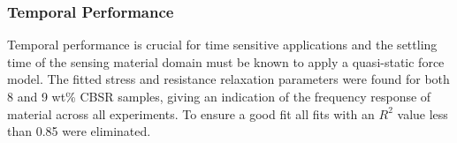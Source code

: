 
\subsubsection{Temporal Performance}\label{sec:Temporal Performance2}
Temporal performance is crucial for time sensitive applications and the settling time of the sensing material domain must be known to apply a quasi-static force model. The fitted stress and resistance relaxation parameters were found for both 8 and 9 wt\% CBSR samples, giving an indication of the frequency response of material across all experiments. To ensure a good fit all fits with an $R^2$ value less than 0.85 were eliminated.


    

